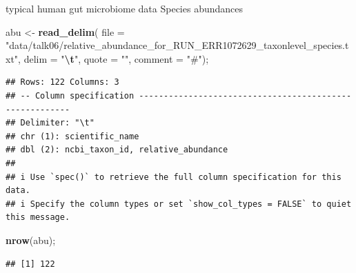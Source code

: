 \documentclass[ignorenonframetext,]{beamer}
\newenvironment{Shaded}{\begin{snugshade}}{\end{snugshade}}
\newcommand{\AttributeTok}[1]{\textcolor[rgb]{0.13,0.29,0.53}{#1}}
\newcommand{\FunctionTok}[1]{\textcolor[rgb]{0.13,0.29,0.53}{\textbf{#1}}}
\newcommand{\NormalTok}[1]{#1}
\newcommand{\OtherTok}[1]{\textcolor[rgb]{0.56,0.35,0.01}{#1}}
\newcommand{\SpecialCharTok}[1]{\textcolor[rgb]{0.81,0.36,0.00}{\textbf{#1}}}
\newcommand{\StringTok}[1]{\textcolor[rgb]{0.31,0.60,0.02}{#1}}
\newcommand\FontSmall{\fontsize{7}{8}\selectfont}
\begin{document}
\begin{frame}[fragile]{typical human gut microbiome data}
\protect\hypertarget{typical-human-gut-microbiome-data}{}
Species abundances

\FontSmall

\begin{Shaded}
\begin{Highlighting}[]
\NormalTok{abu }\OtherTok{\textless{}{-}} 
  \FunctionTok{read\_delim}\NormalTok{(}
    \AttributeTok{file =} \StringTok{"data/talk06/relative\_abundance\_for\_RUN\_ERR1072629\_taxonlevel\_species.txt"}\NormalTok{,}
    \AttributeTok{delim =} \StringTok{"}\SpecialCharTok{\textbackslash{}t}\StringTok{"}\NormalTok{, }\AttributeTok{quote =} \StringTok{""}\NormalTok{, }\AttributeTok{comment =} \StringTok{"\#"}\NormalTok{);}
\end{Highlighting}
\end{Shaded}

\begin{verbatim}
## Rows: 122 Columns: 3
## -- Column specification --------------------------------------------------------
## Delimiter: "\t"
## chr (1): scientific_name
## dbl (2): ncbi_taxon_id, relative_abundance
## 
## i Use `spec()` to retrieve the full column specification for this data.
## i Specify the column types or set `show_col_types = FALSE` to quiet this message.
\end{verbatim}

\begin{Shaded}
\begin{Highlighting}[]
\FunctionTok{nrow}\NormalTok{(abu);}
\end{Highlighting}
\end{Shaded}

\begin{verbatim}
## [1] 122
\end{verbatim}
\end{frame}
\end{document}

